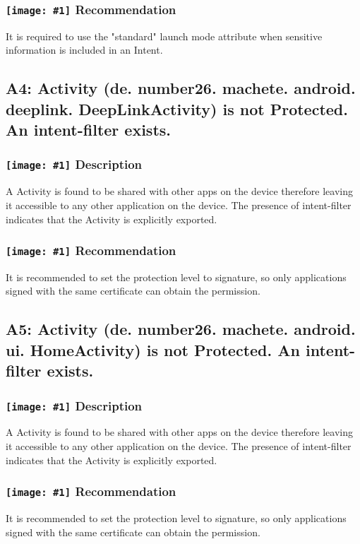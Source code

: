 \documentclass[12p]{article}
\newcommand{\icon}[1]{\texttt{[image: \#1]}}
\begin{document}
\subsubsection*{\protect\icon{/home/miki/Documents/GITHUB/AndroidPermissions/python/vulns/report_icons/basic_todo.png} Recommendation}
It is required to use the "standard" launch mode attribute when sensitive information is included in an Intent.
\subsection{A4: Activity (de. number26. machete. android. deeplink. DeepLinkActivity) is not Protected. An intent-filter exists.}
\subsubsection*{\protect\icon{/home/miki/Documents/GITHUB/AndroidPermissions/python/vulns/report_icons/basic_sheet.png} Description}
A  Activity is found to be shared with other apps on the device therefore leaving it accessible to any other application on the device. The presence of intent-filter indicates that the Activity is explicitly exported.
\subsubsection*{\protect\icon{/home/miki/Documents/GITHUB/AndroidPermissions/python/vulns/report_icons/basic_todo.png} Recommendation}
It is recommended to set the protection level to signature, so only applications signed with the same certificate can obtain the permission.
\subsection{A5: Activity (de. number26. machete. android. ui. HomeActivity) is not Protected. An intent-filter exists.}
\subsubsection*{\protect\icon{/home/miki/Documents/GITHUB/AndroidPermissions/python/vulns/report_icons/basic_sheet.png} Description}
A  Activity is found to be shared with other apps on the device therefore leaving it accessible to any other application on the device. The presence of intent-filter indicates that the Activity is explicitly exported.
\subsubsection*{\protect\icon{/home/miki/Documents/GITHUB/AndroidPermissions/python/vulns/report_icons/basic_todo.png} Recommendation}
It is recommended to set the protection level to signature, so only applications signed with the same certificate can obtain the permission.
\end{document}
